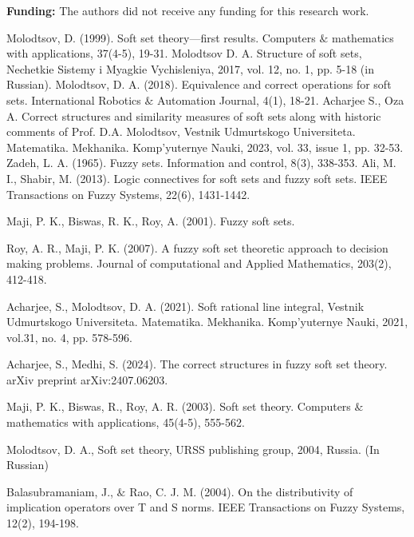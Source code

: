 \documentclass{article}
\theoremstyle{definition}
\begin{document}
{\bf Funding:} The authors did not receive any funding for this research work. 
\begin{thebibliography}{}

   Molodtsov, D. (1999). Soft set theory—first results. Computers $\&$ mathematics with applications, 37(4-5), 19-31.
   Molodtsov D. A. Structure of soft sets, Nechetkie Sistemy i Myagkie Vychisleniya, 2017, vol. 12, no. 1, pp. 5-18 (in Russian).
   Molodtsov, D. A. (2018). Equivalence and correct operations for soft sets. International Robotics $\&$ Automation Journal, 4(1), 18-21.
   Acharjee S., Oza A. Correct structures and similarity measures of soft sets along with historic comments of Prof. D.A. Molodtsov, Vestnik Udmurtskogo Universiteta. Matematika. Mekhanika. Komp'yuternye Nauki, 2023, vol. 33, issue 1, pp. 32-53.
   Zadeh, L. A. (1965). Fuzzy sets. Information and control, 8(3), 338-353.
   Ali, M. I.,  Shabir, M. (2013). Logic connectives for soft sets and fuzzy soft sets. IEEE Transactions on Fuzzy Systems, 22(6), 1431-1442.
   
   Maji, P. K., Biswas, R. K.,  Roy, A. (2001). Fuzzy soft sets.
   
   Roy, A. R., Maji, P. K. (2007). A fuzzy soft set theoretic approach to decision making problems. Journal of computational and Applied Mathematics, 203(2), 412-418.
  
   Acharjee, S.,  Molodtsov, D. A. (2021). Soft rational line integral, Vestnik Udmurtskogo Universiteta. Matematika. Mekhanika. Komp'yuternye Nauki, 2021,  vol.31, no. 4, pp. 578-596.

    Acharjee, S.,  Medhi, S. (2024). The correct structures in fuzzy soft set theory. arXiv preprint arXiv:2407.06203.

Maji, P. K., Biswas, R.,  Roy, A. R. (2003). Soft set theory. Computers $\&$ mathematics with applications, 45(4-5), 555-562.

Molodtsov, D. A., Soft set theory, URSS publishing group, 2004, Russia. (In Russian)

Balasubramaniam, J., $\&$ Rao, C. J. M. (2004). On the distributivity of implication operators over T and S norms. IEEE Transactions on Fuzzy Systems, 12(2), 194-198.


    
\end{thebibliography}
\end{document}
